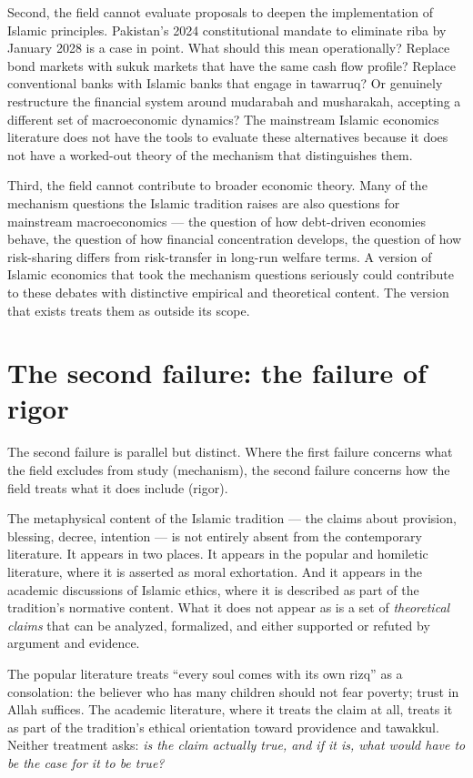 Second, the field cannot evaluate proposals to deepen the
implementation of Islamic principles. Pakistan's 2024 constitutional
mandate to eliminate riba by January 2028 is a case in point. What
should this mean operationally? Replace bond markets with sukuk
markets that have the same cash flow profile? Replace conventional
banks with Islamic banks that engage in tawarruq? Or genuinely
restructure the financial system around mudarabah and musharakah,
accepting a different set of macroeconomic dynamics? The mainstream
Islamic economics literature does not have the tools to evaluate
these alternatives because it does not have a worked-out theory of
the mechanism that distinguishes them.

Third, the field cannot contribute to broader economic theory. Many
of the mechanism questions the Islamic tradition raises are also
questions for mainstream macroeconomics --- the question of how
debt-driven economies behave, the question of how financial
concentration develops, the question of how risk-sharing differs
from risk-transfer in long-run welfare terms. A version of Islamic
economics that took the mechanism questions seriously could
contribute to these debates with distinctive empirical and
theoretical content. The version that exists treats them as outside
its scope.

\section{The second failure: the failure of rigor}
\label{sec:second-failure}

The second failure is parallel but distinct. Where the first failure
concerns what the field excludes from study (mechanism), the second
failure concerns how the field treats what it does include (rigor).

The metaphysical content of the Islamic tradition --- the claims
about provision, blessing, decree, intention --- is not entirely
absent from the contemporary literature. It appears in two places.
It appears in the popular and homiletic literature, where it is
asserted as moral exhortation. And it appears in the academic
discussions of Islamic ethics, where it is described as part of the
tradition's normative content. What it does not appear as is a set
of \emph{theoretical claims} that can be analyzed, formalized, and
either supported or refuted by argument and evidence.

The popular literature treats ``every soul comes with its own rizq''
as a consolation: the believer who has many children should not
fear poverty; trust in Allah suffices. The academic literature, where
it treats the claim at all, treats it as part of the tradition's
ethical orientation toward providence and tawakkul. Neither treatment
asks: \emph{is the claim actually true, and if it is, what would have
to be the case for it to be true?}

